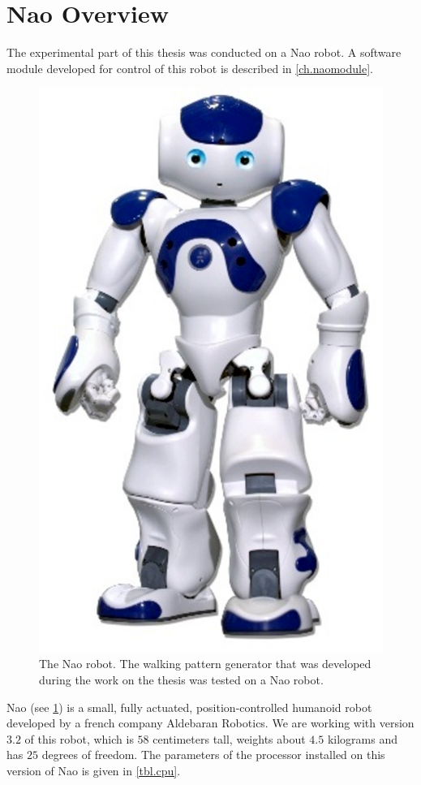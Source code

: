 \section{Nao Overview}\label{sec.nao}
The experimental part of this thesis was conducted on a Nao robot. A software 
module developed for control of this robot is described in \cref{ch.naomodule}.

\begin{figure}[ht]
    \centerline{%
    \includegraphics[scale=0.35]{Figures/nao.eps}}
    \caption[The Nao robot]{The Nao robot. The walking pattern generator that was 
    developed during the work on the thesis was tested on a Nao robot.}
    \label{fig.nao}
\end{figure}
Nao (see \cref{fig.nao}) is a small, fully actuated, position-controlled humanoid 
robot developed by a french company Aldebaran Robotics. We are working with 
version $3.2$ of this robot, which is $58$ centimeters tall, weights about $4.5$ 
kilograms and has $25$ degrees of freedom. The parameters of the processor installed
on this version of Nao is given in \cref{tbl.cpu}.

